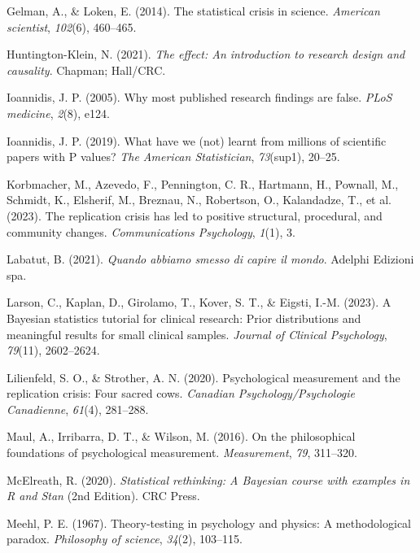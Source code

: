 \documentclass[
  letterpaper,
]{krantz}
\newlength{\cslhangindent}
\newenvironment{CSLReferences}[2] %
 {\begin{list}{}{%
  \setlength{\itemindent}{0pt}
  \setlength{\leftmargin}{0pt}
  \setlength{\parsep}{0pt}
  \ifodd #1
   \setlength{\leftmargin}{\cslhangindent}
   \setlength{\itemindent}{-1\cslhangindent}
  \fi
  \setlength{\itemsep}{#2\baselineskip}}}
 {\end{list}}
\begin{document}
\begin{CSLReferences}{1}{0}
Gelman, A., \& Loken, E. (2014). The statistical crisis in science.
\emph{American scientist}, \emph{102}(6), 460--465.

Huntington-Klein, N. (2021). \emph{The effect: An introduction to
research design and causality}. Chapman; Hall/CRC.

Ioannidis, J. P. (2005). Why most published research findings are false.
\emph{PLoS medicine}, \emph{2}(8), e124.

Ioannidis, J. P. (2019). What have we (not) learnt from millions of
scientific papers with P values? \emph{The American Statistician},
\emph{73}(sup1), 20--25.

Korbmacher, M., Azevedo, F., Pennington, C. R., Hartmann, H., Pownall,
M., Schmidt, K., Elsherif, M., Breznau, N., Robertson, O., Kalandadze,
T., et al. (2023). The replication crisis has led to positive
structural, procedural, and community changes. \emph{Communications
Psychology}, \emph{1}(1), 3.

Labatut, B. (2021). \emph{Quando abbiamo smesso di capire il mondo}.
Adelphi Edizioni spa.

Larson, C., Kaplan, D., Girolamo, T., Kover, S. T., \& Eigsti, I.-M.
(2023). A Bayesian statistics tutorial for clinical research: Prior
distributions and meaningful results for small clinical samples.
\emph{Journal of Clinical Psychology}, \emph{79}(11), 2602--2624.

Lilienfeld, S. O., \& Strother, A. N. (2020). Psychological measurement
and the replication crisis: Four sacred cows. \emph{Canadian
Psychology/Psychologie Canadienne}, \emph{61}(4), 281--288.

Maul, A., Irribarra, D. T., \& Wilson, M. (2016). On the philosophical
foundations of psychological measurement. \emph{Measurement}, \emph{79},
311--320.

McElreath, R. (2020). \emph{Statistical rethinking: {A} {Bayesian}
course with examples in {R} and {Stan}} (2nd Edition). CRC Press.

Meehl, P. E. (1967). Theory-testing in psychology and physics: A
methodological paradox. \emph{Philosophy of science}, \emph{34}(2),
103--115.


\end{CSLReferences}
\end{document}
